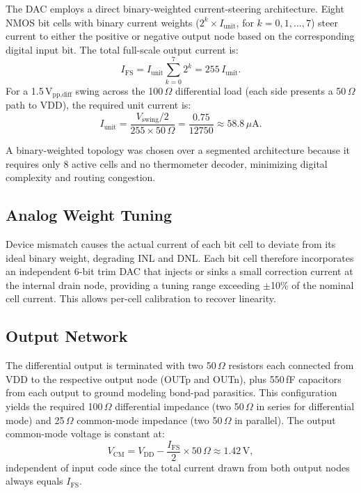 \documentclass[lettersize,journal]{IEEEtran}
\begin{document}
The DAC employs a direct binary-weighted current-steering architecture.
Eight NMOS bit cells with binary current weights ($2^k \times I_\text{unit}$, for
$k = 0, 1, \ldots, 7$) steer current to either the positive or negative output node
based on the corresponding digital input bit.
The total full-scale output current is:
%
\begin{equation}
  I_\text{FS} = I_\text{unit} \sum_{k=0}^{7} 2^k = 255\, I_\text{unit}.
  \label{eq:ifs}
\end{equation}
%
For a 1.5\,V$_{\text{pp,diff}}$ swing across the 100\,$\Omega$ differential load
(each side presents a 50\,$\Omega$ path to VDD), the required unit current is:
%
\begin{equation}
  I_\text{unit} = \frac{V_\text{swing}/2}{255 \times 50\,\Omega}
                = \frac{0.75}{12750} \approx 58.8\,\mu\text{A}.
  \label{eq:iunit}
\end{equation}

A binary-weighted topology was chosen over a segmented architecture because it
requires only 8 active cells and no thermometer decoder, minimizing digital
complexity and routing congestion.

\subsection{Analog Weight Tuning}

Device mismatch causes the actual current of each bit cell to deviate from its
ideal binary weight, degrading INL and DNL.
Each bit cell therefore incorporates an independent 6-bit trim DAC that
injects or sinks a small correction current at the internal drain node,
providing a tuning range exceeding $\pm$10\% of the nominal cell current.
This allows per-cell calibration to recover linearity.

\subsection{Output Network}

The differential output is terminated with two 50\,$\Omega$ resistors each
connected from VDD to the respective output node (OUTp and OUTn), plus
550\,fF capacitors from each output to ground modeling bond-pad parasitics.
This configuration yields the required 100\,$\Omega$ differential impedance
(two 50\,$\Omega$ in series for differential mode) and 25\,$\Omega$
common-mode impedance (two 50\,$\Omega$ in parallel).
The output common-mode voltage is constant at:
%
\begin{equation}
  V_\text{CM} = V_\text{DD} - \frac{I_\text{FS}}{2} \times 50\,\Omega \approx 1.42\,\text{V},
  \label{eq:vcm}
\end{equation}
%
independent of input code since the total current drawn from both output nodes
always equals $I_\text{FS}$.
\end{document}
